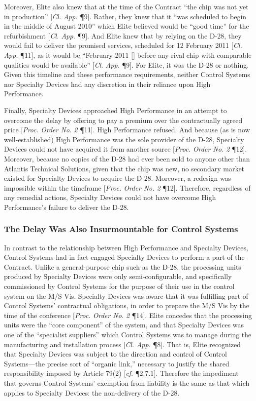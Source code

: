 Moreover, Elite also knew that at the time of the Contract ``the chip was not yet in production'' [\textit{Cl. App.} \P9]. Rather, they knew that it ``was scheduled to begin in the middle of August 2010'' which Elite believed would be ``good time'' for the refurbishment [\textit{Cl. App.} \P9]. And Elite knew that by relying on the D-28, they would fail to deliver the promised services, scheduled for 12 February 2011 [\textit{Cl. App.} \P 11], as it would be ``February 2011 [] before any rival chip with comparable qualities would be available'' [\textit{Cl. App.} \P9]. For Elite, it was the D-28 or nothing.  Given this timeline and these performance requirements, neither Control Systems nor Specialty Devices had any discretion in their reliance upon High Performance. 

Finally, Specialty Devices approached High Performance in an attempt to overcome the delay by offering to pay a premium over the contractually agreed price [\textit{Proc. Order No. 2} \P11]. High Performance refused. And because (as is now well-established) High Performance was the sole provider of the D-28, Specialty Devices could not have acquired it from another source [\textit{Proc. Order No. 2} \P12]. Moreover, because no copies of the D-28 had ever been sold to anyone other than Atlantis Technical Solutions, given that the chip was new, no secondary market existed for Specialty Devices to acquire the D-28. Moreover, a redesign was impossible within the timeframe [\textit{Proc. Order No. 2} \P12]. Therefore, regardless of any remedial actions, Specialty Devices could not have overcome High Performance's failure to deliver the D-28. 

\subsubsection{The Delay Was Also Insurmountable for Control Systems} 

In contrast to the relationship between High Performance and Specialty Devices, Control Systems had in fact engaged Specialty Devices to perform a part of the Contract. Unlike a general-purpose chip such as the D-28, the processing units produced by Specialty Devices were only semi-configurable, and specifically commissioned by Control Systems for the purpose of their use in the control system on the M/S Vis. Specialty Devices was aware that it was fulfilling part of Control Systems' contractual obligations, in order to prepare the M/S Vis by the time of the conference [\textit{Proc. Order No. 2} \P14]. Elite concedes that the processing units were the ``core component'' of the system, and that Specialty Devices was one of the ``specialist suppliers'' which Control Systems was to manage during the manufacturing and installation process [\textit{Cl. App.} \P8]. That is, Elite recognized that Specialty Devices was subject to the direction and control of Control Systems---the precise sort of ``organic link,'' necessary to justify the shared responsibility imposed by Article 79(2) [\textit{cf.} \cite{Tallon} \P2.7.1]. Therefore the impediment that governs Control Systems' exemption from liability is the same as that which applies to Specialty Devices: the non-delivery of the D-28. 

